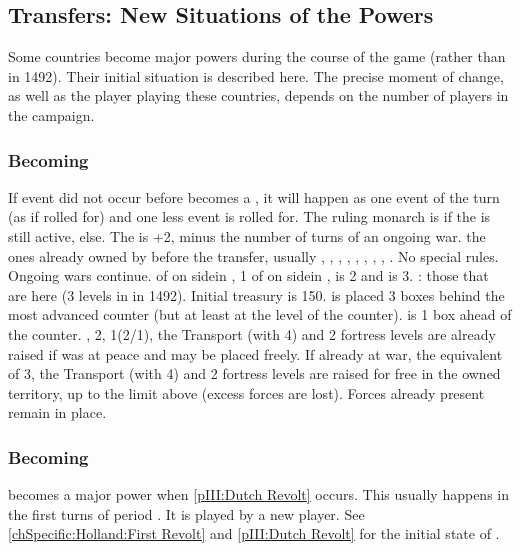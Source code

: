 \subsection{Transfers: New Situations of the Powers}
\aparag Some countries become major powers during the course of the game
(rather than in 1492). Their initial situation is described here.
\bparag The precise moment of change, as well as the player playing these
countries, depends on the number of players in the campaign.

\subsubsection{Becoming \paysmajeurSuede}
\aparag If event  did not occur before \SUE becomes a
\MAJ, it will happen as one event of the turn (as if rolled for) and one less
event is rolled for.
 The ruling monarch is  if the
 is still active,  else. The \STAB
is +2, minus the number of turns of an ongoing war.
 the ones already owned by \MIN \payssuede before the
transfer, usually \provinceSmaland, \provinceJamtland, \provinceGastrikland,
\provinceBergslagen, \provinceSvealand, \provinceFinland, \provinceTavastland,
\provinceNyland, \provinceKarelen.
 No special rules. Ongoing wars continue.
\MNU of  on side\faceplus in \provinceSvealand, 1 \MNU of
 on side\facemoins in \provinceJamtland, \FTI is 2 and \DTI is
3. \TradeFLEET: those that are here (3 levels in \seazoneBaltique in 1492).
\bparag Initial treasury is 150\ducats.
\aparag[Military]
\bparag {} is placed 3 boxes behind the most advanced
counter (but at least at the level of the  counter).  is 1 box ahead of the  counter.
\ARMY\faceplus, 2\LD, 1\FLEET\facemoins (2\NWD/1\NTD), the Transport
\FLEET\faceplus (with 4\NTD) and 2 fortress levels are already raised if
\payssuede was at peace and may be placed freely. If already at war, the
equivalent of 3\LD, the Transport \FLEET\faceplus (with 4\NTD) and 2 fortress
levels are raised for free in the owned territory, up to the limit above
(excess forces are lost). Forces already present remain in place.


\subsubsection{Becoming \paysmajeurHollande}
\aparag \HOL becomes a major power when \ref{pIII:Dutch Revolt} occurs. This
usually happens in the first turns of period .
\bparag It is played by a new player. 
\aparag See \ref{chSpecific:Holland:First Revolt} and \ref{pIII:Dutch Revolt}
for the initial state of \paysmajeurHollande.


